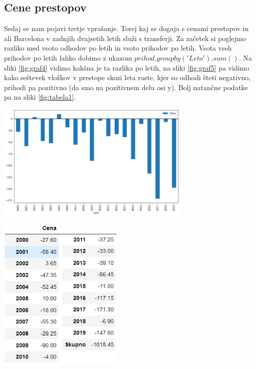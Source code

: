 \documentclass[a4paper, 12pt]{article}
\begin{document}
\subsection{Cene prestopov}
Sedaj se nam pojavi tretje vprašanje. Torej kaj se dogaja s cenami prestopov in ali Barcelona v zadnjih dvajsetih letih služi s transferji. 
Za začetek si poglejmo razliko med vsoto odhodov po letih in vsoto prihodov po letih. Vsota vseh prihodov po letih lahko dobimo z ukazom $prihod.groupby('Leto').sum()$. Na sliki \ref{fig:graf4} vidimo kakšna je ta razlika po letih, na sliki \ref{fig:graf5} pa vidimo kako seštevek vložkov v prestope skozi leta raste, kjer so odhodi šteti negativno, prihodi pa pozitivno (da smo na pozitivnem delu osi y). Bolj natančne podatke pa na sliki \ref{fig:tabela1}.

\begin{center}
\includegraphics[width=0.7\textwidth]{graf4}
\label{fig:graf4}

\includegraphics[width=0.45\textwidth]{tabela1}
\label{fig:tabela1}


\end{center}
\end{document}
